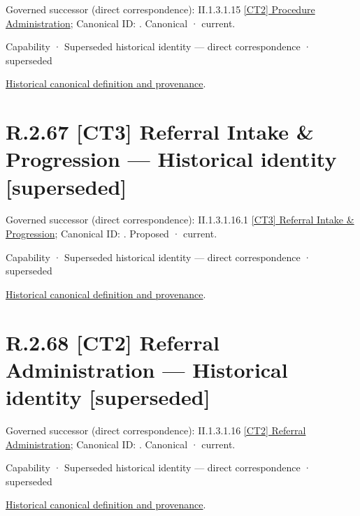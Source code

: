 {\small Governed successor (direct correspondence): II.1.3.1.15 \hyperref[element:649dd7cc26094e539386a050086dfb91]{[CT2] Procedure Administration}; Canonical ID: \texttt{}. Canonical · current.}\par
\label{element:466a4057001846bb8ae0481453d3e410}
{\small Capability · Superseded historical identity — direct correspondence · superseded}\par
\href{../../../../../../../continuum/strategy/capability/466a4057001846bb8ae0481453d3e410.md}{Historical canonical definition and provenance}.\par
\section*{R.2.67 [CT3] Referral Intake \& Progression — Historical identity [superseded]}
\label{navigation:R.2.67}

{\small Governed successor (direct correspondence): II.1.3.1.16.1 \hyperref[element:d11bdb9464b2476894aa372ab9b929a7]{[CT3] Referral Intake \& Progression}; Canonical ID: \texttt{}. Proposed · current.}\par
\label{element:7180f6265d5c4687a001220c6126e301}
{\small Capability · Superseded historical identity — direct correspondence · superseded}\par
\href{../../../../../../../continuum/strategy/capability/7180f6265d5c4687a001220c6126e301.md}{Historical canonical definition and provenance}.\par
\section*{R.2.68 [CT2] Referral Administration — Historical identity [superseded]}
\label{navigation:R.2.68}

{\small Governed successor (direct correspondence): II.1.3.1.16 \hyperref[element:ae0de25600ee416aa24d2a167b64f230]{[CT2] Referral Administration}; Canonical ID: \texttt{}. Canonical · current.}\par
\label{element:5b0ccf4b30054145952c298b348ed266}
{\small Capability · Superseded historical identity — direct correspondence · superseded}\par
\href{../../../../../../../continuum/strategy/capability/5b0ccf4b30054145952c298b348ed266.md}{Historical canonical definition and provenance}.\par

